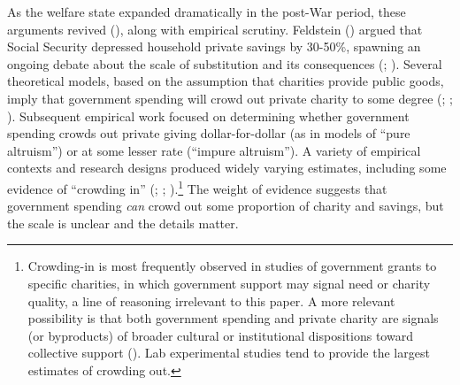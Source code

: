 \documentclass[
  11pt,
  oneside]{article}
\begin{document}
As the welfare state expanded dramatically in the post-War period, these arguments revived (), along with empirical scrutiny. Feldstein () argued that Social Security depressed household private savings by 30-50\%, spawning an ongoing debate about the scale of substitution and its consequences (; ). Several theoretical models, based on the assumption that charities provide public goods, imply that government spending will crowd out private charity to some degree (; ; ). Subsequent empirical work focused on determining whether government spending crowds out private giving dollar-for-dollar (as in models of ``pure altruism'') or at some lesser rate (``impure altruism''). A variety of empirical contexts and research designs produced widely varying estimates, including some evidence of ``crowding in'' (; ; ).\footnote{Crowding-in is most frequently observed in studies of government grants to specific charities, in which government support may signal need or charity quality, a line of reasoning irrelevant to this paper. A more relevant possibility is that both government spending and private charity are signals (or byproducts) of broader cultural or institutional dispositions toward collective support (). Lab experimental studies tend to provide the largest estimates of crowding out.} The weight of evidence suggests that government spending \emph{can} crowd out some proportion of charity and savings, but the scale is unclear and the details matter.
\end{document}
